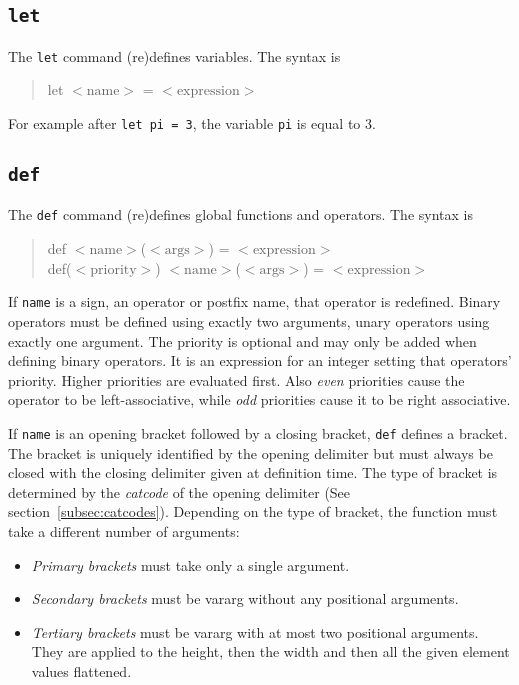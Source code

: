 \documentclass[10pt]{article}
\newcommand{\argument}[1]{{${\big<}\mathrm{#1}{\big>}$}}
\newenvironment{code}{\begin{quote}\ttfamily}{\end{quote}}
\begin{document}
    \subsection{\texttt{let}}\label{subsec:cmd-let}
    The \verb|let| command {\small(re)}defines variables.
    The syntax is
    \begin{code}
        let \argument{name} = \argument{expression}
    \end{code}
    For example after \verb|let pi = 3|, the variable \verb|pi| is equal to $ 3 $.
    
    \subsection{\texttt{def}}\label{subsec:cmd-def}
    The \verb|def| command {\small(re)}defines global functions and operators.
    The syntax is
    \begin{code}
        def \argument{name}(\argument{args}) = \argument{expression} \\
        def(\argument{priority}) \argument{name}(\argument{args}) = \argument{expression}
    \end{code}
    If \verb|name| is a sign, an operator or postfix name, that operator is redefined.
    Binary operators must be defined using exactly two arguments, unary operators using exactly one argument.
    The priority is optional and may only be added when defining binary operators.
    It is an expression for an integer setting that operators' priority.
    Higher priorities are evaluated first.
    Also \textsl{even} priorities cause the operator to be left-associative, while \textsl{odd} priorities cause it to be right associative.
    
    If \verb|name| is an opening bracket followed by a closing bracket, \verb|def| defines a bracket.
    The bracket is uniquely identified by the opening delimiter but must always be closed with the closing delimiter given at definition time.
    The type of bracket is determined by the \textsl{catcode} of the opening delimiter (See section~\ref{subsec:catcodes}).
    Depending on the type of bracket, the function must take a different number of arguments:
    \begin{itemize}
        \item \textsl{Primary brackets} must take only a single argument.
        \item \textsl{Secondary brackets} must be vararg without any positional arguments.
        \item \textsl{Tertiary brackets} must be vararg with at most two positional arguments.
              They are applied to the height, then the width and then all the given element values flattened.
    \end{itemize}
    
\end{document}
